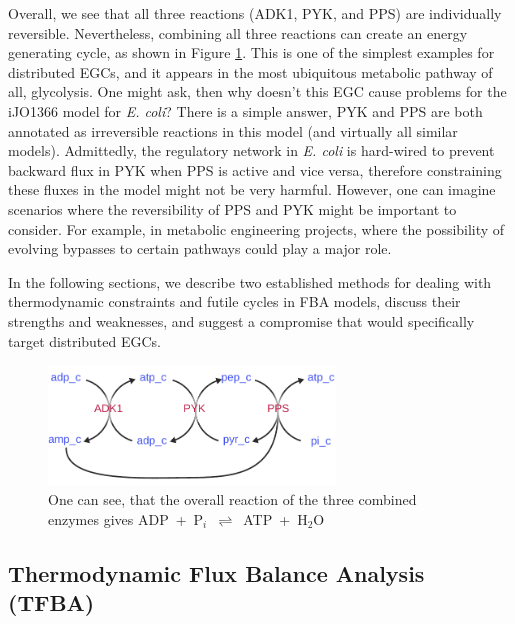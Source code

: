 \documentclass[twocolumn]{bmcart}%
\begin{document}
Overall, we see that all three reactions (ADK1, PYK, and PPS) are individually reversible. Nevertheless, combining all three reactions can create an energy generating cycle, as shown in Figure \ref{fig:distributed_egc}. This is one of the simplest examples for distributed EGCs, and it appears in the most ubiquitous metabolic pathway of all, glycolysis. One might ask, then why doesn't this EGC cause problems for the iJO1366 model for \emph{E. coli}? There is a simple answer, PYK and PPS are both annotated as irreversible reactions in this model (and virtually all similar models). Admittedly, the regulatory network in \emph{E. coli} is hard-wired to prevent backward flux in PYK when PPS is active and vice versa, therefore constraining these fluxes in the model might not be very harmful. However, one can imagine scenarios where the reversibility of PPS and PYK might be important to consider. For example, in metabolic engineering projects, where the possibility of evolving bypasses to certain pathways could play a major role.

In the following sections, we describe two established methods for dealing with thermodynamic constraints and futile cycles in FBA models, discuss their strengths and weaknesses, and suggest a compromise that would specifically target distributed EGCs.

\begin{figure}[h!]
	\includegraphics[width=3in]{figure3.pdf}
	\caption{
		One can see, that the overall reaction of the three combined enzymes gives ADP~+~P$_i$~$\rightleftharpoons$~ATP~+~H$_2$O}
	\label{fig:distributed_egc}
\end{figure}

\subsection*{Thermodynamic Flux Balance Analysis (TFBA)}
\end{document}
